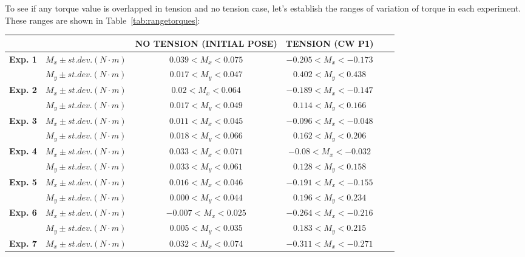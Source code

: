 To see if any torque value is overlapped in tension and no tension case, let's establish the ranges of variation of torque in each experiment. These ranges are shown in  Table~\ref{tab:rangetorques}:
\setlength\LTpost{0pt}
\begin{longtable} {|r|c|c|c|c|c|}
		\cmidrule{3-4}    \multicolumn{1}{r}{} &       & \textbf{NO TENSION (INITIAL POSE)} & \textbf{TENSION (CW P1)} \\
		\midrule
		\multicolumn{1}{|l|}{\textbf{Exp. 1}} & \textbf{$M_{x} \pm st. dev. (N \cdot m)$} & $0.039 < M_{x} < 0.075$ & $-0.205 < M_{x} < -0.173 $ \\
		& \textbf{$M_{y} \pm st. dev. (N \cdot m)$} & $0.017 < M_{y} < 0.047$ & $0.402 < M_{y} < 0.438$ \\
		\cmidrule{1-4}
		\multicolumn{1}{|l|}{\textbf{Exp. 2}} & \textbf{$M_{x} \pm st. dev. (N \cdot m)$} & $0.02 < M_{x} < 0.064$ & $-0.189 < M_{x} < -0.147$ \\
		& \textbf{$M_{y} \pm st. dev. (N \cdot m)$} & $0.017 < M_{y} < 0.049$ & $0.114 < M_{y} < 0.166$ \\
		\cmidrule{1-4}
		\multicolumn{1}{|l|}{\textbf{Exp. 3}} & \textbf{$M_{x} \pm st. dev. (N \cdot m)$} & $0.011 < M_{x} < 0.045$ & $-0.096 < M_{x} < -0.048$ \\
		& \textbf{$M_{y} \pm st. dev. (N \cdot m)$} & $0.018 < M_{y} < 0.066$ & $0.162 < M_{y} < 0.206$ \\
		\cmidrule{1-4}
		\multicolumn{1}{|l|}{\textbf{Exp. 4}} & \textbf{$M_{x} \pm st. dev. (N \cdot m)$} & $0.033 < M_{x} < 0.071$ & $-0.08 < M_{x} < -0.032$ \\
		& \textbf{$M_{y} \pm st. dev. (N \cdot m)$} & $0.033 < M_{y} < 0.061$ & $0.128 < M_{y} < 0.158$ \\
		\cmidrule{1-4}
		\multicolumn{1}{|l|}{\textbf{Exp. 5}} & \textbf{$M_{x} \pm st. dev. (N \cdot m)$} & $0.016 < M_{x} < 0.046$ & $-0.191 < M_{x} < -0.155$ \\
		& \textbf{$M_{y} \pm st. dev. (N \cdot m)$} & $0.000 < M_{y} < 0.044$ & $0.196 < M_{y} < 0.234$ \\
		\cmidrule{1-4}
		\multicolumn{1}{|l|}{\textbf{Exp. 6}} & \textbf{$M_{x} \pm st. dev. (N \cdot m)$} & $-0.007 < M_{x} < 0.025$ & $-0.264 < M_{x} < -0.216$ \\
		& \textbf{$M_{y} \pm st. dev. (N \cdot m)$} & $0.005 < M_{y} < 0.035$ & $0.183 < M_{y} < 0.215$ \\
		\cmidrule{1-4}
		\multicolumn{1}{|l|}{\textbf{Exp. 7}} & \textbf{$M_{x} \pm st. dev. (N \cdot m)$} & $0.032 < M_{x} < 0.074$ & $-0.311 < M_{x} < -0.271$ \\

\end{longtable}
